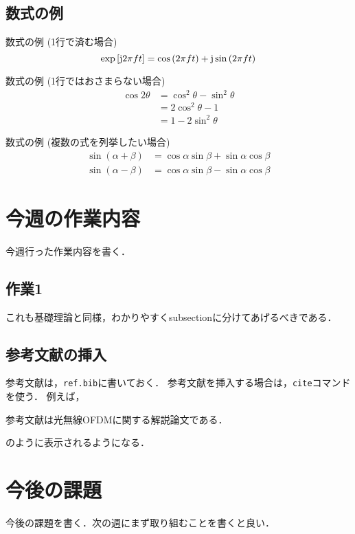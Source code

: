 \documentclass[fleqn, a4paper, twocolumn]{jsarticle}
\numberwithin{figure}{section}
\numberwithin{table}{section}
\numberwithin{equation}{section}
\begin{document}
\subsection{数式の例}
数式の例 (1行で済む場合)
\begin{equation}
	\exp \qty[\mathrm{j}2\pi ft] = \cos \qty(2\pi ft) + \mathrm{j}\sin \qty(2\pi ft)
	\label{eq: euler}
\end{equation}

数式の例 (1行ではおさまらない場合)
\begin{equation}
	\begin{split}
		\cos 2\theta & = \cos^2\theta-\sin^2\theta \\ %
		             & = 2\cos^2\theta - 1         \\         %
		             & = 1 - 2\sin^2\theta         %
		\label{eq: doubleangle}
	\end{split}
\end{equation}

数式の例 (複数の式を列挙したい場合)
\begin{align}
	\sin (\alpha + \beta) & = \cos \alpha \sin \beta + \sin \alpha \cos \beta \\
	\sin (\alpha - \beta) & = \cos \alpha \sin \beta - \sin \alpha \cos \beta
\end{align}

\section{今週の作業内容}
今週行った作業内容を書く．
\subsection{作業1}
これも基礎理論と同様，わかりやすくsubsectionに分けてあげるべきである．

\subsection{参考文献の挿入}
参考文献は，\texttt{ref.bib}に書いておく．
参考文献を挿入する場合は，\texttt{cite}コマンドを使う．
例えば，

参考文献\cite{ohuchi2019}は光無線OFDMに関する解説論文である．

のように表示されるようになる．

\section{今後の課題}
今後の課題を書く．次の週にまず取り組むことを書くと良い．

\end{document}
